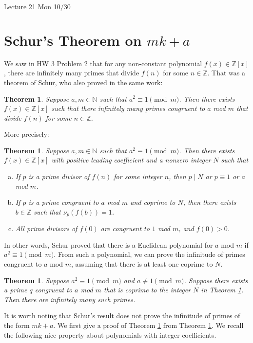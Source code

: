 \documentclass{article}
\def\Z{{\mathbb Z}}
\def\N{{\mathbb N}}
\def\Z{{\mathbb Z}}
\newtheorem{theorem}[subsection]{Theorem}
\newcommand{\add}[1]{{\color{blue} #1}}
\begin{document}
\begin{center}
    \add{Lecture 21 Mon 10/30}
\end{center}
\section{Schur's Theorem on $mk + a$}

We saw in HW 3 Problem 2 that for any non-constant polynomial $f(x)\in\Z[x]$, there are infinitely many primes that divide $f(n)$ for some $n\in\Z$. That was a theorem of Schur, who also proved in the same work:

\begin{theorem}
    Suppose $a,m\in\N$ such that $a^2\equiv 1\pmod{m}$. Then there exists $f(x)\in\Z[x]$ such that there infinitely many primes congruent to $a$ mod $m$ that divide $f(n)$ for some $n\in\Z$.
\end{theorem}

More precisely:

\begin{theorem}\label{thm:a1}
    Suppose $a,m\in\N$ such that $a^2\equiv 1\pmod{m}$. Then there exists $f(x)\in\Z[x]$ with positive leading coefficient and a nonzero integer $N$ such that
    \begin{enumerate}[(a)]
        \item If $p$ is a prime divisor of $f(n)$ for some integer $n$, then $p\mid N$ or $p\equiv 1$ or $a$ mod $m$.
        \item If $p$ is a prime congruent to $a$ mod $m$ and coprime to $N$, then there exists $b\in\Z$ such that $\nu_p(f(b)) = 1$.
        \item All prime divisors of $f(0)$ are congruent to $1$ mod $m$, and $f(0) > 0$.
    \end{enumerate}
\end{theorem}

In other words, Schur proved that there is a Euclidean polynomial for $a$ mod $m$ if $a^2\equiv 1\pmod{m}$. From such a polynomial, we can prove the infinitude of primes congruent to $a$ mod $m$, assuming that there is at least one coprime to $N$.
\begin{theorem}\label{thm:fa1}
    Suppose $a^2\equiv 1\pmod{m}$ and $a\not\equiv 1\pmod{m}$. Suppose there exists a prime $q$ congruent to $a$ mod $m$ that is coprime to the integer $N$ in Theorem \ref{thm:a1}. Then there are infinitely many such primes.
\end{theorem}

It is worth noting that Schur's result does not prove the infinitude of primes of the form $mk + a$. We first give a proof of Theorem \ref{thm:fa1} from Theorem \ref{thm:a1}. We recall the following nice property about polynomials with integer coefficients.
\end{document}
